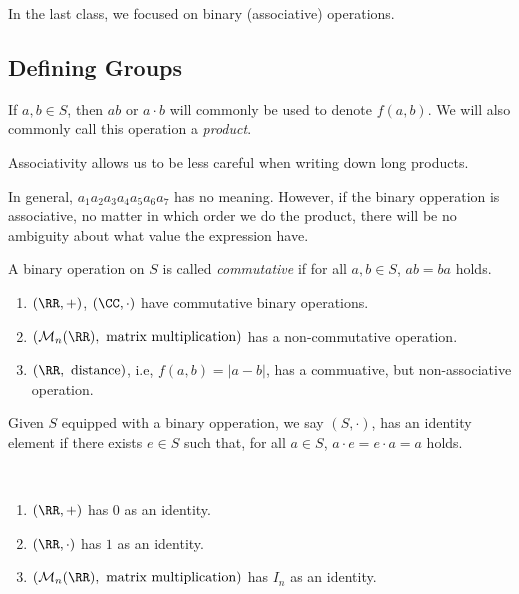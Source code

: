 
In the last class, we focused on binary (associative) operations.

\subsection{Defining Groups}

\begin{defn}[Notation]
	If $a, b \in S$, then $ab$ or $a \cdot b$ will commonly be used to denote $f(a,b)$. We will also commonly call this operation a \emph{product}.
\end{defn}

Associativity allows us to be less careful when writing down long products.

\begin{exmp}
	In general, $a_1a_2a_3a_4a_5a_6a_7$ has no meaning. However, if the binary opperation is associative, no matter in which order we do the product, there will be no ambiguity about what value the expression have.
\end{exmp}

\begin{defn}
	A binary operation on $S$ is called \emph{commutative} if for all $a, b \in S$, $ab = ba$ holds.
\end{defn}

\begin{exmp}
	\begin{enumerate}
		\item $(\RR, +)$,  $(\CC, \cdot)$ have commutative binary operations.
		\item $(\mathcal{M}_n(\RR), \text{ matrix multiplication})$ has a non-commutative operation.
		\item $(\RR, \text{ distance})$, i.e, $f(a, b) = |a-b|$, has a commuative, but non-associative operation.
	\end{enumerate}
\end{exmp}

\begin{defn}
	Given $S$ equipped with a binary opperation, we say $(S, \cdot)$, has an identity element if there exists  $e \in S$ such that, for all $a \in S$, $a \cdot e = e \cdot a = a$ holds.
\end{defn}

\begin{exmp}~
	\begin{enumerate}
		\item $(\RR, +)$ has  $0$ as an identity.
		\item $(\RR, \cdot)$ has  $1$ as an identity.
		\item $(\mathcal{M}_n(\RR),\ \text{matrix multiplication})$ has $I_n$ as an identity.
	\end{enumerate}
\end{exmp}

